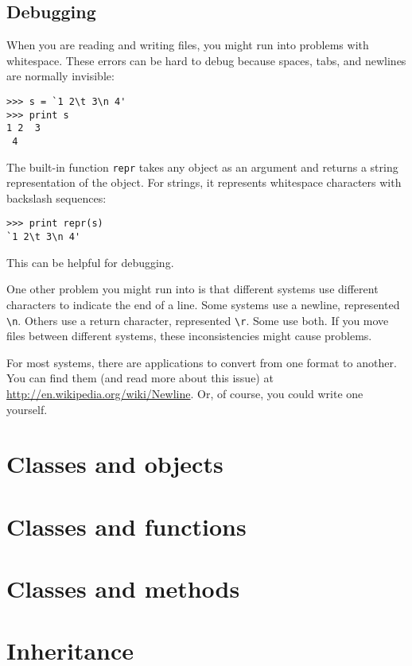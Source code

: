 \documentclass{article}
\begin{document}
\subsection{Debugging} %
When you are reading and writing files, you might run into problems
with whitespace. These errors can be hard to debug because spaces,
tabs, and newlines are normally invisible:
\begin{verbatim}
>>> s = `1 2\t 3\n 4'
>>> print s
1 2  3
 4
\end{verbatim}
The built-in function \verb|repr| takes any object as an argument and
returns a string representation of the object. For strings, it
represents whitespace characters with backslash sequences:
\begin{verbatim}
>>> print repr(s)
`1 2\t 3\n 4'
\end{verbatim}
This can be helpful for debugging.

One other problem you might run into is that different systems use
different characters to indicate the end of a line. Some systems use a
newline, represented \verb|\n|. Others use a return character, represented
\verb|\r|. Some use both. If you move files between different systems, these
inconsistencies might cause problems.

For most systems, there are applications to convert from one format to
another. You can find them (and read more about this issue) at
\url{http://en.wikipedia.org/wiki/Newline}. Or, of course, you could write
one yourself.


\newpage%
\section{Classes and objects}
\newpage%
\section{Classes and functions}
\newpage%
\section{Classes and methods}
\newpage%
\section{Inheritance}
\newpage%
\end{document}
